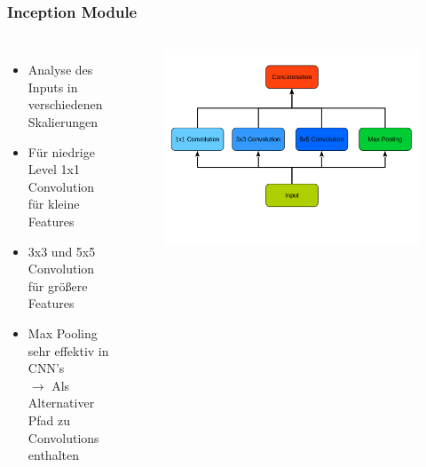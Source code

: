 \documentclass{beamer}
\begin{document}
\begin{frame}
	\frametitle{Inception Module}
	\begin{columns}[c]
		\begin{itemize}
			\item Analyse des Inputs in verschiedenen Skalierungen
			\item F\"{u}r niedrige Level 1x1 Convolution f\"{u}r kleine Features
			\item 3x3 und 5x5 Convolution f\"{u}r gr\"{o}{\ss}ere Features
			\item Max Pooling sehr effektiv in CNN's \\ 
			$\rightarrow$ Als Alternativer Pfad zu Convolutions enthalten
		\end{itemize}
		
		\begin{figure}
			\includegraphics[width=\linewidth]{images/inception_naive_graph.png}
		\end{figure}
	\end{columns}
\end{frame}
\end{document}
